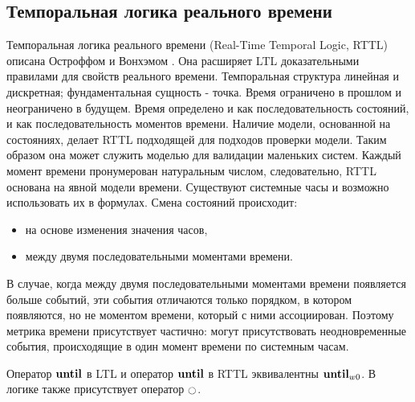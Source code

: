 		\subsection{Темпоральная логика реального времени}
		Темпоральная логика реального времени (Real-Time Temporal Logic, RTTL) описана Остроффом и Вонхэмом \cite{RTTLWon} \cite{RTTL}. Она расширяет LTL доказательными правилами для свойств реального времени.
		Темпоральная структура линейная и дискретная; фундаментальная сущность - точка.
		Время ограничено в прошлом и неограничено в будущем.
		Время определено и как последовательность состояний, и как последовательность моментов времени.
		Наличие модели, основанной на состояниях, делает RTTL подходящей для подходов проверки модели.
		Таким образом она может служить моделью для валидации маленьких систем.
		Каждый момент времени пронумерован натуральным числом, следовательно, RTTL основана на явной модели времени.
		Существуют системные часы и возможно использовать их в формулах.
		Смена состояний происходит:
		\begin{itemize}
			\item на основе изменения значения часов,
			\item между двумя последовательными моментами времени.
		\end{itemize}
		В случае, когда между двумя последовательными моментами времени появляется больше событий, эти события отличаются только порядком, в котором появляются, но не моментом времени, который с ними ассоциирован.
		Поэтому метрика времени присутствует частично: могут присутствовать неодновременные события, происходящие в один момент времени по системным часам.
		
		Оператор $ \text{\textbf{until}} $ в LTL и оператор $ \text{\textbf{until}} $ в RTTL эквивалентны $ \text{\textbf{until}}_{w0} $. В логике также присутствует оператор $ \Next $. 
		
